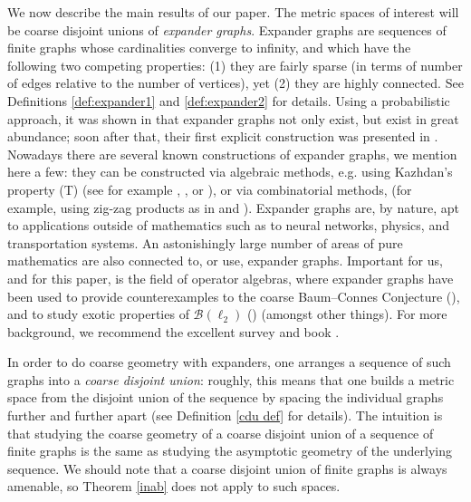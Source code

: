 \documentclass[11pt]{amsart}
\newcommand{\cstar}{$\mathrm{C}^*$}
\numberwithin{equation}{section}
\theoremstyle{definition}
\theoremstyle{remark}
\numberwithin{equation}{section}
\begin{document}
We now describe the main results of our paper. The metric spaces of interest will be coarse disjoint unions of \emph{expander graphs}. Expander graphs are sequences of finite graphs whose cardinalities converge to infinity, and which have the following two competing properties: (1) they are fairly sparse (in terms of number of edges relative to the number of vertices), yet  (2) they are highly connected.  See Definitions \ref{def:expander1} and \ref{def:expander2} for details.  Using a probabilistic approach, it was shown in \cite{Pinsker} that expander graphs not only exist, but exist in great abundance; soon after that, their first   explicit construction was presented in  \cite{Margulis1973ExpanderConstruction}. Nowadays there are several known constructions of expander graphs, we mention here a few:  they can be  constructed via algebraic methods, e.g. using Kazhdan's property (T) (see for example \cite[\S 3]{DavidoffSarnakValette}, \cite[\S6.1]{BekkaDelaValette}, or \cite{Tao15}), or via combinatorial methods, (for example, using zig-zag products as in \cite{RVW02} and \cite{MendelNaor14}). Expander graphs are, by nature, apt to applications outside of mathematics such as to  neural networks, physics, and transportation systems. An astonishingly large number of areas of pure mathematics  are also connected to, or use, expander graphs. Important for us, and for this paper, is the field of operator algebras, where expander graphs have been used to provide counterexamples to the coarse Baum--Connes Conjecture (\cite[\S7]{HigsonLafforgueSkandalis2002GAFA}), %
and to study exotic properties of $\mathcal{B}(\ell_2)$ (\cite[\S24.4 and 24.5]{Pisier:2020aa})
(amongst other things).  For more background, we recommend the excellent survey \cite{Kowalski.Expanders} and book \cite{LubotzkyBook2010}.  

In order to do coarse geometry with expanders, one arranges a sequence of such graphs into a \emph{coarse disjoint union}: roughly, this means that one builds a metric space from the disjoint union of the sequence by spacing the individual graphs further and further apart (see Definition \ref{cdu def} for details).  The intuition is that studying the coarse geometry of a coarse disjoint union of a sequence of finite graphs is the same as studying the asymptotic geometry of the underlying sequence.  We should note that a coarse disjoint union of finite graphs is always amenable, so Theorem \ref{inab} does not apply to such spaces.
\end{document}
